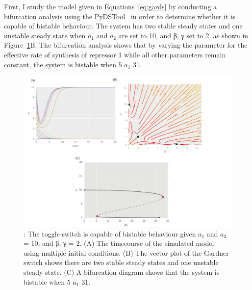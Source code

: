 First, I study the model given in Equations~\ref{eq:gards} by conducting a bifurcation analysis using the PyDSTool~\autocite{Clewley:2012kj} in order to determine whether it is capable of bistable behaviour. The system has two stable steady states and one unstable steady state when $a_1$ and $a_2$ are set to 10, and β, γ set to 2, as shown in Figure~\ref{fig:Gard_CS}B. The bifurcation analysis shows that by varying the parameter for the effective rate of synthesis of repressor 1 while all other parameters remain constant, the system is bistable when 5 \ge{} $a_1$ \le{} 31.



\begin{figure}[htbp]
	\begin{center}
\includegraphics[scale=0.7]{../../chapters/chapterABCSysBio/images/Gard_CS.png}
\caption[LoF caption]{\label{fig:Gard_CS}: The \textcite{Gardner:2000vha} toggle switch is capable of bistable behaviour given $a_1$ and $a_2$ = 10, and β, γ = 2. (A) The timecourse of the simulated model using multiple initial conditions. (B) The vector plot of the Gardner switch shows there are two stable steady states and one unstable steady state. (C) A bifurcation diagram shows that the system is bistable when 5 \ge{} $a_1$ \le{} 31.}
\end{center}
\end{figure}
\clearpage


